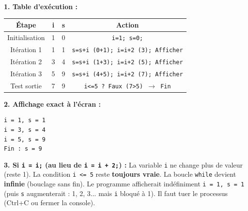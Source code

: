 \documentclass[11pt]{article}
\begin{document}
\begin{corrige}
\textbf{1. Table d'exécution :}

\begin{center}
\begin{tabular}{|c|c|c|c|}
\hline
\rowcolor{popblueL} \textbf{Étape} & \textbf{i} & \textbf{s} & \textbf{Action} \\
\hline
Initialisation & 1 & 0 & \texttt{i=1; s=0;} \\
\hline
Itération 1 & 1 & 1 & \texttt{s=s+i (0+1); i=i+2 (3); Afficher} \\
\hline
Itération 2 & 3 & 4 & \texttt{s=s+i (1+3); i=i+2 (5); Afficher} \\
\hline
Itération 3 & 5 & 9 & \texttt{s=s+i (4+5); i=i+2 (7); Afficher} \\
\hline
Test sortie & 7 & 9 & \texttt{i<=5 ? Faux (7>5) $\rightarrow$ Fin} \\
\hline
\end{tabular}
\end{center}

\textbf{2. Affichage exact à l'écran :}
\begin{lstlisting}
i = 1, s = 1
i = 3, s = 4
i = 5, s = 9
Fin : s = 9
\end{lstlisting}

\textbf{3. Si \texttt{i = i;} (au lieu de \texttt{i = i + 2;}) :}
La variable \texttt{i} ne change plus de valeur (reste 1). La condition \texttt{i <= 5} reste \textbf{toujours vraie}. La boucle \texttt{while} devient \textbf{infinie} (bouclage sans fin). Le programme afficherait indéfiniment \texttt{i = 1, s = 1} (puis \texttt{s} augmenterait : 1, 2, 3... mais \texttt{i} bloqué à 1). Il faut tuer le processus (Ctrl+C ou fermer la console).
\end{corrige}
\end{document}
